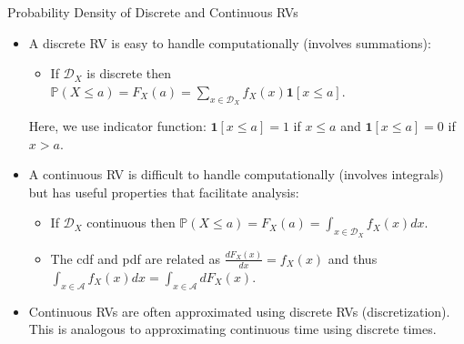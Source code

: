 \documentclass[9pt]{beamer}
\begin{document}
%
\begin{frame}{Probability Density of Discrete and Continuous RVs}

\begin{itemize}
\item A discrete RV is easy to handle computationally  (involves summations):
\vspace{0.1in}
\begin{itemize}
 \setlength{\itemsep}{5pt}
\item If $\mathcal{D}_X$ is discrete then $\mathbb{P}(X\leq a)=F_X(a)=\sum_{x\in \mathcal{D}_X}f_X(x)\mathbf{1}[x\leq a]$. 
\end{itemize}
\vspace{0.1in}
Here, we use  indicator  function: $\mathbf{1}[x\leq a]=1$ if $x\leq a$ and $\mathbf{1}[x\leq a]=0$ if $x> a$. 
\vspace{0.1in}
\item A continuous RV is difficult to handle computationally (involves integrals) but has useful properties that facilitate analysis:
\vspace{0.1in}
\begin{itemize}
 \setlength{\itemsep}{5pt}
\item If $\mathcal{D}_X$ continuous then $\mathbb{P}(X\leq a)=F_X(a)=\int_{x\in \mathcal{D}_X}f_X(x)dx$. 
\item The cdf and pdf are related as $\frac{dF_X(x)}{dx}=f_X(x)$ and thus $\int_{x\in \mathcal{A}}f_X(x)dx=\int_{x\in \mathcal{A}}dF_X(x)$.
\end{itemize}
\vspace{0.1in}
\item Continuous RVs are often approximated using discrete RVs (discretization). This is analogous to approximating continuous time using discrete times. 

\end{itemize}


\end{frame}
\end{document}
